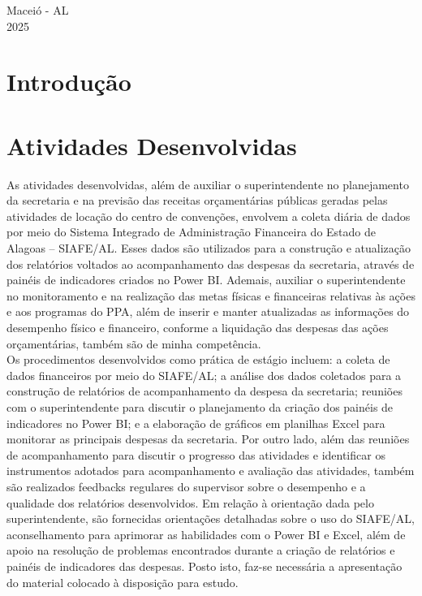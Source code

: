 \documentclass[12pt,a4paper]{article}
\begin{document}
	\vfill
	\begin{flushright}
		\centering Maceió - AL \\
		2025
	\end{flushright}
	
	\newpage
	
	\section{Introdução}
	
	\hspace*{1,5cm}
	
	\section{Atividades Desenvolvidas}
	
	\hspace*{1,5cm}As atividades desenvolvidas, além de auxiliar o superintendente no planejamento da 
	secretaria e na previsão das receitas orçamentárias públicas geradas pelas atividades de locação 
	do centro de convenções, envolvem a coleta diária de dados por meio do Sistema Integrado de 
	Administração Financeira do Estado de Alagoas – SIAFE/AL. Esses dados são utilizados para 
	a construção e atualização dos relatórios voltados ao acompanhamento das despesas da 
	secretaria, através de painéis de indicadores criados no Power BI. Ademais, auxiliar o 
	superintendente no monitoramento e na realização das metas físicas e financeiras relativas às 
	ações e aos programas do PPA, além de inserir e manter atualizadas as informações do 
	desempenho físico e financeiro, conforme a liquidação das despesas das ações orçamentárias, 
	também são de minha competência. \\
	\hspace*{1,5cm}Os procedimentos desenvolvidos como prática de estágio incluem: a coleta de dados 
	financeiros por meio do SIAFE/AL; a análise dos dados coletados para a construção de 
	relatórios de acompanhamento da despesa da secretaria; reuniões com o superintendente para 
	discutir o planejamento da criação dos painéis de indicadores no Power BI; e a elaboração de 
	gráficos em planilhas Excel para monitorar as principais despesas da secretaria. Por outro lado, 
	além das reuniões de acompanhamento para discutir o progresso das atividades e identificar os 
	instrumentos adotados para acompanhamento e avaliação das atividades, também são 
	realizados feedbacks regulares do supervisor sobre o desempenho e a qualidade dos relatórios 
	desenvolvidos. Em relação à orientação dada pelo superintendente, são fornecidas orientações 
	detalhadas sobre o uso do SIAFE/AL, aconselhamento para aprimorar as habilidades com o 
	Power BI e Excel, além de apoio na resolução de problemas encontrados durante a criação de 
	relatórios e painéis de indicadores das despesas. Posto isto, faz-se necessária a apresentação do 
	material colocado à disposição para estudo.
\end{document}
